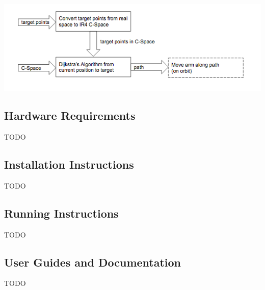 \includegraphics[width=\textwidth]{./images/ProjectDocs/pathingAndAutomationFlow}

\subsection{Hardware Requirements}
TODO

\subsection{Installation Instructions}
TODO

\subsection{Running Instructions}
TODO

\subsection{User Guides and Documentation}
TODO

